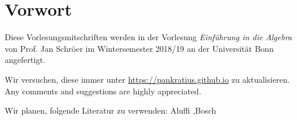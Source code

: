 \chapter*{Vorwort}
Diese Vorlesungsmitschriften werden in der Vorlesung \textit{Einführung in die Algebra} von Prof. Jan Schröer im Wintersemester 2018/19 an der Universität Bonn angefertigt.\par
Wir versuchen, diese immer unter \url{https://pankratius.github.io} zu aktualisieren. Any comments and suggestions are highly appreciated.\par
Wir planen, folgende Literatur zu verwenden:
Aluffi \cite{aluffi},Bosch \cite{bosch} 